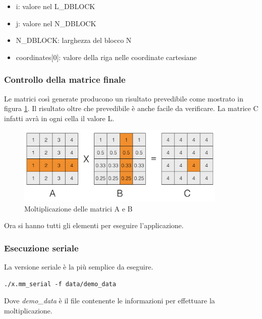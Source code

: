 \begin{itemize}
  \item i: valore nel L\_DBLOCK
  \item j: valore nel N\_DBLOCK
  \item N\_DBLOCK: larghezza del blocco N
  \item coordinates[0]: valore della riga nelle coordinate cartesiane
\end{itemize}

\subsubsection{Controllo della matrice finale}

Le matrici cos\`{i} generate producono un risultato prevedibile come mostrato in figura \ref{fig:matrix_gen_multiplication}. Il risultato oltre che prevedibile \`{e} anche facile da verificare. La matrice C infatti avr\`{a} in ogni cella il valore L.

\begin{figure}[htbp]
    \begin{center}
        \includegraphics[width=10cm]{immagini/matrix_gen_multiplication.png}
    \end{center}
    \caption{Moltiplicazione delle matrici A e B}
    \label{fig:matrix_gen_multiplication}
\end{figure}

Ora si hanno tutti gli elementi per eseguire l'applicazione.

\subsubsection{Esecuzione seriale}

La versione seriale \`{e} la pi\`{u} semplice da eseguire.

\begin{lstlisting}
./x.mm_serial -f data/demo_data
\end{lstlisting}

Dove \textit{demo\_data} \`{e} il file contenente le informazioni per effettuare la moltiplicazione.

